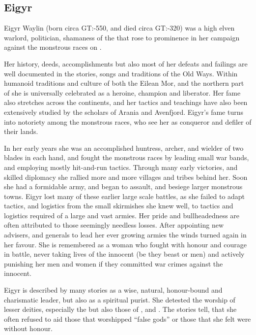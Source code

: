 \subsection{Eigyr}
\label{sec:Eigyr}

Eigyr Waylin (born circa GT:-550, and died circa GT:-320) was a high elven
warlord, politician, shamaness of the  that rose to
prominence in her campaign against the monstrous races on .

Her history, deeds, accomplishments but also most of her defeats and failings
are well documented in the stories, songs and traditions of the Old Ways. Within
humanoid traditions and culture of both the Eilean Mor, and the northern part of
 she is universally celebrated as a heroine, champion and
liberator. Her fame also stretches across the continents, and her tactics and
teachings have also been extensively studied by the scholars of Arania and
Avenfjord. Eigyr's fame turns into notoriety among the monstrous races, who see
her as conqueror and defiler of their lands.

In her early years she was an accomplished huntress, archer, and wielder of
two blades in each hand, and fought the monstrous races by leading small war
bands, and employing mostly hit-and-run tactics. Through many early victories,
and skilled diplomacy she rallied more and more villages and tribes behind
her. Soon she had a formidable army, and began to assault, and besiege larger
monstrous towns. Eigyr lost many of these earlier large scale battles, as she
failed to adapt tactics, and logistics from the small skirmishes she knew well,
to tactics and logistics required of a large and vast armies. Her pride and
bullheadedness are often attributed to those seemingly needless losses.  After
appointing new advisers, and generals to lead her ever growing armies the winds
turned again in her favour. She is remembered as a woman who fought with
honour and courage in battle, never taking lives of the innocent (be they
beast or men) and actively punishing her men and women if they committed war
crimes against the innocent.

Eigyr is described by many stories as a wise, natural, honour-bound and
charismatic leader, but also as a spiritual purist. She detested the worship
of lesser deities, especially the  but also those of
, and . The stories tell, that she often
refused to aid those that worshipped ``false gods'' or those that she felt were
without honour.

